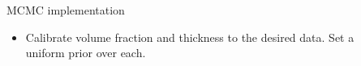 \documentclass[final]{beamer}
\newlength{\sepwid}
\newlength{\onecolwid}
\newlength{\twocolwid}
\begin{document}
\begin{frame}[t]
\begin{columns}[t]
\begin{column}{\twocolwid}
\begin{columns}[t,totalwidth=\twocolwid]
\begin{column}{\onecolwid}
%
%
%
%
%


\end{column} %

\end{columns} %

\end{column} %

\begin{column}{\sepwid}\end{column} %

\begin{column}{\onecolwid} %


\begin{alertblock}{MCMC implementation}

\begin{itemize}

\item Calibrate volume fraction and thickness to the desired data. Set a uniform prior over each.


\end{itemize}
\end{alertblock}
\end{column}
\end{columns}
\end{frame}
\end{document}

